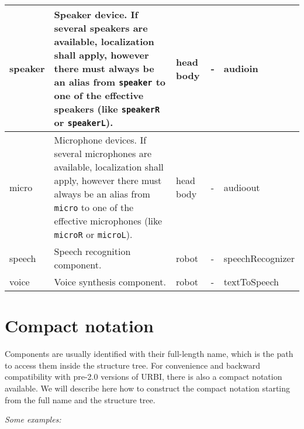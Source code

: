 \documentclass[a4paper]{article}
\begin{document}
\begin{center}
\begin{supertabular}{|m{2.312cm}|m{6.776cm}|m{2.629cm}|m{2.471cm}|m{2.1269999cm}|}
 speaker &
\sffamily Speaker device. If several speakers
are available, localization shall apply, however there must always be
an alias from \texttt{speaker} to one of the effective speakers (like
\texttt{speakerR} or \texttt{speakerL}). &
\ttfamily head body &
\ttfamily {}- &
\ttfamily audioin\\\hline
{} micro  &
\sffamily Microphone devices. If several
microphones are available, localization shall apply, however there must
always be an alias from \texttt{micro} to one of the effective
microphones (like \texttt{microR} or \texttt{microL}). &
\ttfamily head body &
\ttfamily {}- &
\ttfamily audioout\\\hline
{} speech &
\sffamily Speech recognition component. &
\ttfamily robot &
\ttfamily {}- &
\ttfamily speechRecognizer\\\hline
{} voice &
\sffamily Voice synthesis component. &
\ttfamily robot &
\ttfamily {}- &
\ttfamily textToSpeech\\\hline
\end{supertabular}
\end{center}
\section[Compact notation]{ Compact notation}
{\sffamily
Components are usually identified with their full-length name, which is
the path to access them inside the structure tree. For convenience and
backward compatibility with pre-2.0 versions of URBI, there is also a
compact notation available. We will describe here how to construct the
compact notation starting from the full name and the structure tree.}

{\sffamily\itshape
Some examples:}
\end{document}
